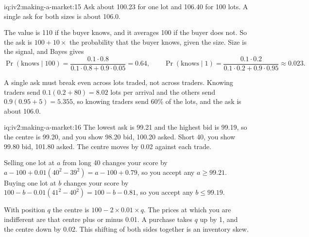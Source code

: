 \begin{solution}{iq:iv2:making-a-market:15}
Ask about 100.23 for one lot and 106.40 for 100 lots. A single ask for both sizes is about 106.0.

The value is 110 if the buyer knows, and it averages 100 if the buyer does not. So the ask is $100 + 10 \times$ the probability that the buyer knows, given the size. Size is the signal, and Bayes gives
\[
\Pr(\text{knows} \mid 100) = \frac{0.1 \cdot 0.8}{0.1 \cdot 0.8 + 0.9 \cdot 0.05} = 0.64, \qquad
\Pr(\text{knows} \mid 1) = \frac{0.1 \cdot 0.2}{0.1 \cdot 0.2 + 0.9 \cdot 0.95} \approx 0.023.
\]

A single ask must break even across lots traded, not across traders. Knowing traders send $0.1(0.2 + 80) = 8.02$ lots per arrival and the others send $0.9(0.95 + 5) = 5.355$, so knowing traders send 60\% of the lots, and the ask is about 106.0.

\end{solution}

\begin{solution}{iq:iv2:making-a-market:16}
The lowest ask is 99.21 and the highest bid is 99.19, so the centre is 99.20, and you show 98.20 bid, 100.20 asked. Short 40, you show 99.80 bid, 101.80 asked. The centre moves by 0.02 against each trade.

Selling one lot at $a$ from long 40 changes your score by $a - 100 + 0.01(40^2 - 39^2) = a - 100 + 0.79$, so you accept any $a \ge 99.21$. Buying one lot at $b$ changes your score by $100 - b - 0.01(41^2 - 40^2) = 100 - b - 0.81$, so you accept any $b \le 99.19$.

With position $q$ the centre is $100 - 2 \times 0.01 \times q$. The prices at which you are indifferent are that centre plus or minus 0.01. A purchase takes $q$ up by 1, and the centre down by 0.02. This shifting of both sides together is an inventory skew.

\end{solution}

